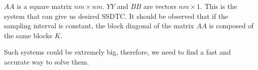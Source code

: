$AA$ is a square matrix $nm \times nm$. $YY$ and $BB$ are vectors $nm \times 1$. This is the system that can give us desired SSDTC. It should be observed that if the sampling interval is constant, the block diagonal of the matrix $AA$ is composed of the same blocks $K$.

Such systems could be extremely big, therefore, we need to find a fast and accurate way to solve them.

